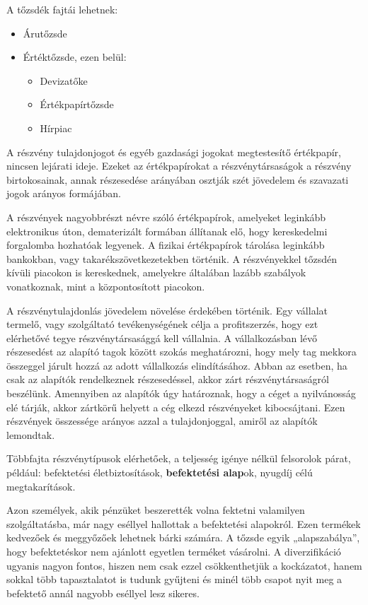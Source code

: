 A tőzsdék fajtái lehetnek: 

\begin{itemize}
\item Árutőzsde
\item Értéktőzsde, ezen belül: 
	\begin{itemize}
	     \item Devizatőke
	     \item Értékpapírtőzsde 
	     \item Hírpiac
	\end{itemize}
\end{itemize}


A részvény tulajdonjogot és egyéb gazdasági jogokat megtestesítő értékpapír, nincsen lejárati ideje. Ezeket az értékpapírokat a részvénytársaságok a részvény birtokosainak, annak részesedése arányában osztják szét jövedelem és szavazati jogok arányos formájában.

	A részvények nagyobbrészt névre szóló értékpapírok, amelyeket leginkább elektronikus úton, dematerizált formában állítanak elő, hogy kereskedelmi forgalomba hozhatóak legyenek. A fizikai értékpapírok tárolása leginkább bankokban, vagy takarékszövetkezetekben történik. A részvényekkel tőzsdén kívüli piacokon is kereskednek, amelyekre általában lazább szabályok vonatkoznak, mint a központosított piacokon. 

	A részvénytulajdonlás jövedelem növelése érdekében történik. Egy vállalat termelő, vagy szolgáltató tevékenységének célja a profitszerzés, hogy ezt elérhetővé tegye részvénytársasággá kell vállalnia. A vállalkozásban lévő részesedést az alapító tagok között szokás meghatározni, hogy mely tag mekkora összeggel járult hozzá az adott vállalkozás elindításához. Abban az esetben, ha csak az alapítók rendelkeznek részesedéssel, akkor zárt részvénytársaságról beszélünk. Amennyiben az alapítók úgy határoznak, hogy a céget a nyilvánosság elé tárják, akkor zártkörű helyett a cég elkezd részvényeket kibocsájtani. Ezen részvények összessége arányos azzal a tulajdonjoggal, amiről az alapítók lemondtak.

	Többfajta részvénytípusok elérhetőek, a teljesség igénye nélkül felsorolok párat, például: befektetési életbiztosítások, \textbf{befektetési alap}ok, nyugdíj célú megtakarítások.


Azon személyek, akik pénzüket beszerették volna fektetni valamilyen szolgáltatásba, már nagy eséllyel hallottak a befektetési alapokról. Ezen termékek kedvezőek és meggyőzőek lehetnek bárki számára. A tőzsde egyik „alapszabálya”, hogy befektetéskor nem ajánlott egyetlen terméket vásárolni. A diverzifikáció ugyanis nagyon fontos, hiszen nem csak ezzel csökkenthetjük a kockázatot, hanem sokkal több tapasztalatot is tudunk gyűjteni és minél több csapot nyit meg a befektető annál nagyobb eséllyel lesz sikeres.

